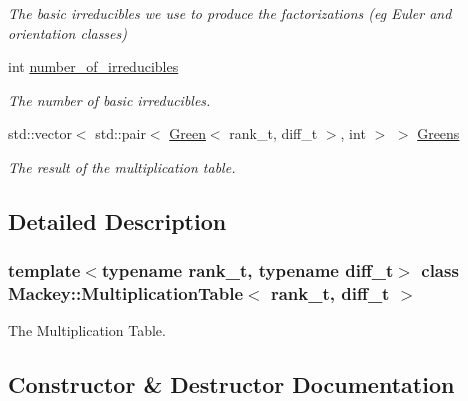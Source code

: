 \begin{DoxyCompactItemize}
\begin{DoxyCompactList}\small\item\em The basic irreducibles we use to produce the factorizations (eg Euler and orientation classes) \end{DoxyCompactList}\item 
int \hyperlink{classMackey_1_1MultiplicationTable_a2a87b9a2f25f4e99c903c8f874fad4fb}{number\+\_\+of\+\_\+irreducibles}
\begin{DoxyCompactList}\small\item\em The number of basic irreducibles. \end{DoxyCompactList}\item 
std\+::vector$<$ std\+::pair$<$ \hyperlink{classMackey_1_1Green}{Green}$<$ rank\+\_\+t, diff\+\_\+t $>$, int $>$ $>$ \hyperlink{classMackey_1_1MultiplicationTable_a045f3f5912a6fe634b1763367725f81f}{Greens}
\begin{DoxyCompactList}\small\item\em The result of the multiplication table. \end{DoxyCompactList}\end{DoxyCompactItemize}


\subsection{Detailed Description}
\subsubsection*{template$<$typename rank\+\_\+t, typename diff\+\_\+t$>$\newline
class Mackey\+::\+Multiplication\+Table$<$ rank\+\_\+t, diff\+\_\+t $>$}

The Multiplication Table. 

\subsection{Constructor \& Destructor Documentation}
\mbox{\label{classMackey_1_1MultiplicationTable_a8530e27d8d2c3c755eb5041a2ee8c35b}} 
